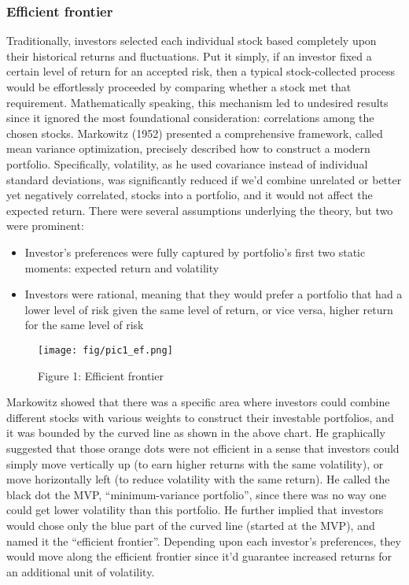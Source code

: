 \subsubsection{Efficient frontier}
Traditionally, investors selected each individual stock based completely upon their historical returns and fluctuations. Put it simply, if an investor fixed a certain level of return for an accepted risk, then a typical stock-collected process would be effortlessly proceeded by comparing whether a stock met that requirement. Mathematically speaking, this mechanism led to undesired results since it ignored the most foundational consideration: correlations among the chosen stocks. Markowitz (1952) presented a comprehensive framework, called mean variance optimization, precisely described how to construct a modern portfolio. Specifically, volatility, as he used covariance instead of individual standard deviations, was significantly reduced if we’d combine unrelated or better yet negatively correlated, stocks into a portfolio, and it would not affect the expected return. There were several assumptions underlying the theory, but two were prominent:
\begin{itemize}
	\item Investor’s preferences were fully captured by portfolio’s first two static moments: expected return and volatility
	\item Investors were rational, meaning that they would prefer a portfolio that had a lower level of risk given the same level of return, or vice versa, higher return for the same level of risk
\end{itemize}

\begin{figure}[h]

 \centering
 \texttt{[image: fig/pic1\_ef.png]}
 \label{fig1:ef}
 \caption{Figure 1: Efficient frontier}

\end{figure}

Markowitz showed that there was a specific area where investors could combine different stocks with various weights to construct their investable portfolios, and it was bounded by the curved line as shown in the above chart. He graphically suggested that those orange dots were not efficient in a sense that investors could simply move vertically up (to earn higher returns with the same volatility), or move horizontally left (to reduce volatility with the same return). He called the black dot the MVP, “minimum-variance portfolio”, since there was no way one could get lower volatility than this portfolio. He further implied that investors would chose only the blue part of the curved line (started at the MVP), and named it the “efficient frontier”. Depending upon each investor’s preferences, they would move along the efficient frontier since it’d guarantee increased returns for an additional unit of volatility.

